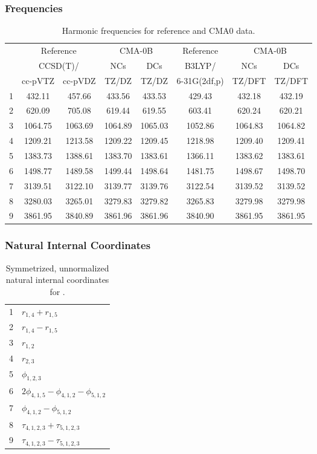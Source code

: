 \documentclass[10pt,oneside]{article}
\begin{document}
\subsubsection*{Frequencies}
\begin{table}[h!]
\centering
\caption{Harmonic frequencies for reference and CMA0 data.}
\begin{tabular}{cccccccc}
\toprule
{} & \multicolumn{2}{c}{Reference} & \multicolumn{2}{c}{CMA-0B} &    Reference & \multicolumn{2}{c}{CMA-0B} \\
{} & \multicolumn{2}{c}{CCSD(T)/} &     NCs &     DCs &       B3LYP/ &     NCs &     DCs \\
{} &   cc-pVTZ & cc-pVDZ &   TZ/DZ &   TZ/DZ & 6-31G(2df,p) &  TZ/DFT &  TZ/DFT \\
\midrule
1 &    432.11 &  457.66 &  433.56 &  433.53 &       429.43 &  432.18 &  432.19 \\
2 &    620.09 &  705.08 &  619.44 &  619.55 &       603.41 &  620.24 &  620.21 \\
3 &   1064.75 & 1063.69 & 1064.89 & 1065.03 &      1052.86 & 1064.83 & 1064.82 \\
4 &   1209.21 & 1213.58 & 1209.22 & 1209.45 &      1218.98 & 1209.40 & 1209.41 \\
5 &   1383.73 & 1388.61 & 1383.70 & 1383.61 &      1366.11 & 1383.62 & 1383.61 \\
6 &   1498.77 & 1489.58 & 1499.44 & 1498.64 &      1481.75 & 1498.67 & 1498.70 \\
7 &   3139.51 & 3122.10 & 3139.77 & 3139.76 &      3122.54 & 3139.52 & 3139.52 \\
8 &   3280.03 & 3265.01 & 3279.83 & 3279.82 &      3265.83 & 3279.98 & 3279.98 \\
9 &   3861.95 & 3840.89 & 3861.96 & 3861.96 &      3840.90 & 3861.95 & 3861.95 \\
\bottomrule
\end{tabular}
\end{table}

\clearpage

\subsubsection*{Natural Internal Coordinates}
\begin{table}[h!]
\centering
\caption{Symmetrized, unnormalized natural internal coordinates for .}
\small
\begin{tabular}{ll}
  1   & $r_{1,4} + r_{1,5}$ \\
  2   & $r_{1,4} - r_{1,5}$ \\
  3   & $r_{1,2}$ \\
  4   & $r_{2,3}$ \\
  5   & $\phi_{1,2,3}$ \\
  6   & $2\phi_{4,1,5} - \phi_{4,1,2} - \phi_{5,1,2}$ \\
  7   & $\phi_{4,1,2} - \phi_{5,1,2}$ \\
  8   & $\tau_{4,1,2,3} + \tau_{5,1,2,3}$ \\
  9   & $\tau_{4,1,2,3} - \tau_{5,1,2,3}$ \\
\end{tabular}
\end{table}
\end{document}
